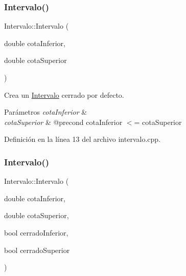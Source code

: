 \subsubsection{\texorpdfstring{Intervalo()}{Intervalo()}\hspace{0.1cm}{\footnotesize\ttfamily [1/2]}}
{\footnotesize\ttfamily Intervalo\+::\+Intervalo (\begin{DoxyParamCaption}\item[{double}]{cota\+Inferior,  }\item[{double}]{cota\+Superior }\end{DoxyParamCaption})}



Crea un \mbox{\hyperlink{classIntervalo}{Intervalo}} cerrado por defecto. 


\begin{DoxyParams}{Parámetros}
{\em cota\+Inferior} & \\
\hline
{\em cota\+Superior} & @precond cota\+Inferior $<$= cota\+Superior \\
\hline
\end{DoxyParams}


Definición en la línea 13 del archivo intervalo.\+cpp.


\begin{DoxyCode}{0}

\end{DoxyCode}
\mbox{\label{classIntervalo_af70d523399465f51862977a303656c72}} 
\subsubsection{\texorpdfstring{Intervalo()}{Intervalo()}\hspace{0.1cm}{\footnotesize\ttfamily [2/2]}}
{\footnotesize\ttfamily Intervalo\+::\+Intervalo (\begin{DoxyParamCaption}\item[{double}]{cota\+Inferior,  }\item[{double}]{cota\+Superior,  }\item[{bool}]{cerrado\+Inferior,  }\item[{bool}]{cerrado\+Superior }\end{DoxyParamCaption})}




